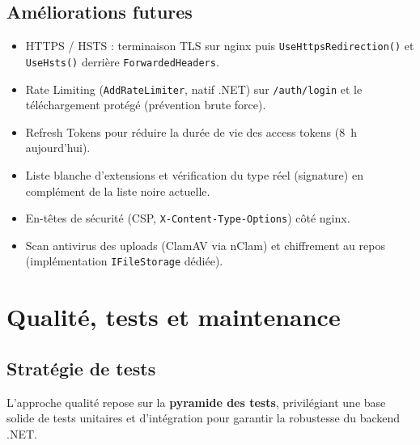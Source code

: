 \documentclass[12pt,a4paper]{article}
\begin{document}
\subsection{Am\'eliorations futures}

\begin{itemize}[nosep]
  \item HTTPS / HSTS : terminaison TLS sur nginx puis \texttt{UseHttpsRedirection()} et \texttt{UseHsts()} derri\`ere \texttt{ForwardedHeaders}.
  \item Rate Limiting (\texttt{AddRateLimiter}, natif .NET) sur \texttt{/auth/login} et le t\'el\'echargement prot\'eg\'e (pr\'evention brute force).
  \item Refresh Tokens pour r\'eduire la dur\'ee de vie des access tokens (8~h aujourd'hui).
  \item Liste blanche d'extensions et v\'erification du type r\'eel (signature) en compl\'ement de la liste noire actuelle.
  \item En-t\^etes de s\'ecurit\'e (CSP, \texttt{X-Content-Type-Options}) c\^ot\'e nginx.
  \item Scan antivirus des uploads (ClamAV via nClam) et chiffrement au repos (impl\'ementation \texttt{IFileStorage} d\'edi\'ee).
\end{itemize}

\section{Qualit\'e, tests et maintenance}

\subsection{Strat\'egie de tests}

L'approche qualit\'e repose sur la \textbf{pyramide des tests}, privil\'egiant une base solide de tests unitaires et d'int\'egration pour garantir la robustesse du backend .NET.
\end{document}
